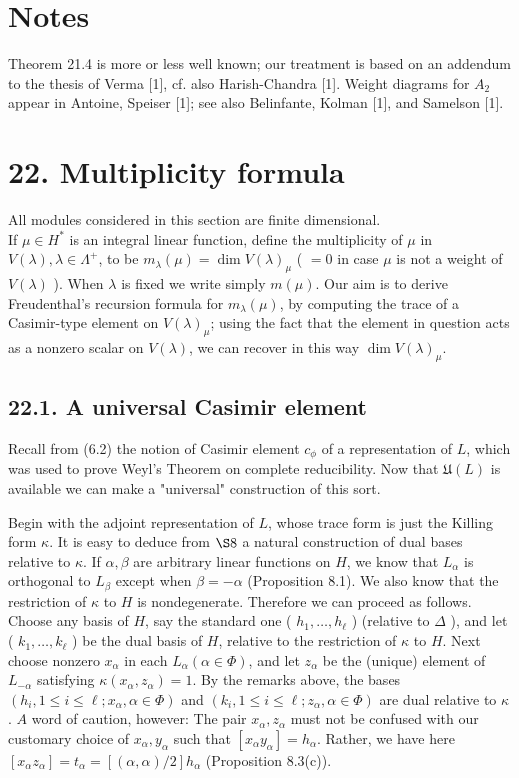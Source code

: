 \documentclass[10pt]{article}
\begin{document}
\section*{Notes}
Theorem 21.4 is more or less well known; our treatment is based on an addendum to the thesis of Verma [1], cf. also Harish-Chandra [1]. Weight diagrams for $A_{2}$ appear in Antoine, Speiser [1]; see also Belinfante, Kolman [1], and Samelson [1].

\section*{22. Multiplicity formula}
All modules considered in this section are finite dimensional.\\
If $\mu \in H^{*}$ is an integral linear function, define the multiplicity of $\mu$ in $V(\lambda), \lambda \in \Lambda^{+}$, to be $m_{\lambda}(\mu)=\operatorname{dim} V(\lambda)_{\mu}$ ( $=0$ in case $\mu$ is not a weight of\\
$V(\lambda)$ ). When $\lambda$ is fixed we write simply $m(\mu)$. Our aim is to derive Freudenthal's recursion formula for $m_{\lambda}(\mu)$, by computing the trace of a Casimir-type element on $V(\lambda)_{\mu}$; using the fact that the element in question acts as a nonzero scalar on $V(\lambda)$, we can recover in this way $\operatorname{dim} V(\lambda)_{\mu}$.

\subsection*{22.1. A universal Casimir element}
Recall from (6.2) the notion of Casimir element $c_{\phi}$ of a representation of $L$, which was used to prove Weyl's Theorem on complete reducibility. Now that $\mathfrak{U}(L)$ is available we can make a "universal" construction of this sort.

Begin with the adjoint representation of $L$, whose trace form is just the Killing form $\kappa$. It is easy to deduce from $\S 8$ a natural construction of dual bases relative to $\kappa$. If $\alpha, \beta$ are arbitrary linear functions on $H$, we know that $L_{\alpha}$ is orthogonal to $L_{\beta}$ except when $\beta=-\alpha$ (Proposition 8.1). We also know that the restriction of $\kappa$ to $H$ is nondegenerate. Therefore we can proceed as follows. Choose any basis of $H$, say the standard one ( $h_{1}, \ldots, h_{\ell}$ ) (relative to $\Delta$ ), and let ( $k_{1}, \ldots, k_{\ell}$ ) be the dual basis of $H$, relative to the restriction of $\kappa$ to $H$. Next choose nonzero $x_{\alpha}$ in each $L_{\alpha}(\alpha \in \Phi)$, and let $z_{\alpha}$ be the (unique) element of $L_{-\alpha}$ satisfying $\kappa\left(x_{\alpha}, z_{\alpha}\right)=1$. By the remarks above, the bases $\left(h_{i}, 1 \leq i \leq \ell ; x_{\alpha}, \alpha \in \Phi\right)$ and $\left(k_{i}, 1 \leq i \leq \ell ; z_{\alpha}, \alpha \in \Phi\right)$ are dual relative to $\kappa$. $A$ word of caution, however: The pair $x_{\alpha}, z_{\alpha}$ must not be confused with our customary choice of $x_{\alpha}, y_{\alpha}$ such that $\left[x_{\alpha} y_{\alpha}\right]=h_{\alpha}$. Rather, we have here $\left[x_{\alpha} z_{\alpha}\right]=t_{\alpha}=[(\alpha, \alpha) / 2] h_{\alpha}$ (Proposition 8.3(c)).
\end{document}
